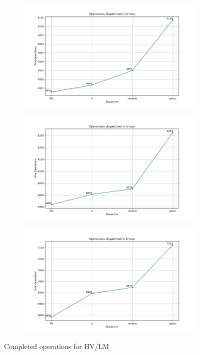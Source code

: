 \begin{figure}[t]
\begin{subfigure}{0.32\textwidth}
	\end{subfigure}
	\begin{subfigure}{0.32\textwidth}
		\includegraphics[width=\textwidth]{HVLM/total_operations_14400s.png}
	\end{subfigure}\hfill
	\begin{subfigure}{0.32\textwidth}
		\includegraphics[width=\textwidth]{HVLM/total_operations_18000s.png}
	\end{subfigure}\hfill
	\begin{subfigure}{0.32\textwidth}
		\includegraphics[width=\textwidth]{HVLM/total_operations_21600s.png}
	\end{subfigure}
	\caption{Completed operations for HV/LM}
	\label{fig:totalopsHVLM}
\end{figure}